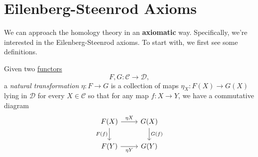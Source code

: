 \section{Eilenberg-Steenrod Axioms}
We can approach the homology theory in an \textbf{axiomatic} way. Specifically, we're interested in the Eilenberg-Steenrod axioms. To start with, we first see some definitions.

\begin{definition}\label{def:natural-transformation}
	Given two \hyperref[def:functor]{functors}
	\[
		F, G \colon \mathscr{C} \to \mathscr{D},
	\]
	a \emph{natural transformation} \(\eta \colon F \to G\) is a collection of maps \(\eta_X \colon F(X) \to G(X)\) lying in \(\mathscr{D}\) for every \(X \in \mathscr{C}\) so that for any map \(f \colon X \to Y\), we have a commutative diagram
	\[
		\begin{tikzcd}
			{F(X)} & {G(X)} \\
			{F(Y)} & {G(Y)}
			\arrow["{\eta X}", from=1-1, to=1-2]
			\arrow["{G(f)}", from=1-2, to=2-2]
			\arrow["{\eta Y}"', from=2-1, to=2-2]
			\arrow["{F(f)}"', from=1-1, to=2-1]
		\end{tikzcd}
	\]
\end{definition}

